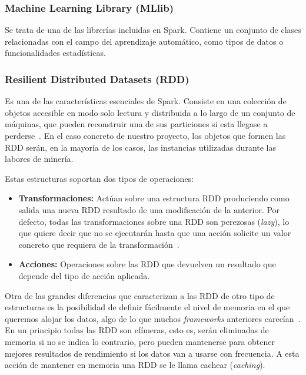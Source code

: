 \subsubsection{Machine Learning Library (MLlib)}\label{MLib}

Se trata de una de las librerías incluidas en Spark. Contiene un conjunto de clases relacionadas con el campo del aprendizaje automático, como tipos de datos o funcionalidades estadísticas.  

\subsubsection{Resilient Distributed Datasets (RDD)}\label{sec:DefRDD}
Es una de las características esenciales de Spark. Consiste en una colección de objetos accesible en modo solo lectura y distribuida a lo largo de un conjunto de máquinas, que pueden reconstruir una de sus particiones si esta llegase a perderse~\cite{SparkPaper}. En el caso concreto de nuestro proyecto, los objetos que formen las RDD serán, en la mayoría de los casos, las instancias utilizadas durante las labores de minería.

Estas estructuras soportan dos tipos de operaciones:

\begin{itemize}
	\item \textbf{Transformaciones:} Actúan sobre una estructura RDD produciendo como salida una nueva RDD resultado de una modificación de la anterior. Por defecto, todas las transformaciones sobre una RDD son perezosas (\textit{lazy}), lo que quiere decir que no se ejecutarán hasta que una acción solicite un valor concreto que requiera de la transformación~\cite{SparkPaper}.
	\item \textbf{Acciones:} Operaciones sobre las RDD que devuelven un resultado que depende del tipo de acción aplicada.
\end{itemize}

Otra de las grandes diferencias que caracterizan a las RDD de otro tipo de estructuras es la posibilidad de definir fácilmente el nivel de memoria en el que queremos alojar los datos, algo de lo que muchos \textit{frameworks} anteriores carecían~\cite{RDDPaper}. En un principio todas las RDD son efímeras, esto es, serán eliminadas de memoria si no se indica lo contrario, pero pueden mantenerse para obtener mejores resultados de rendimiento si los datos van a usarse con frecuencia. A esta acción de mantener en memoria una RDD se le llama cachear (\textit{caching}).

